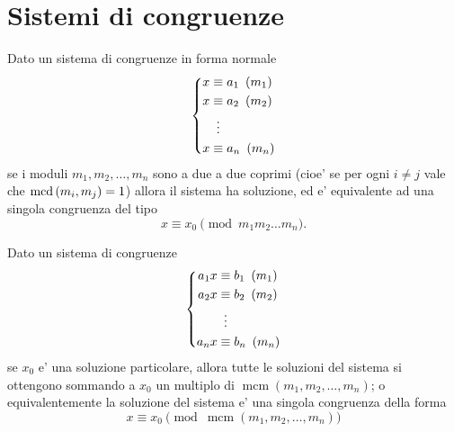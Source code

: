 \section{Sistemi di congruenze}

\begin{theorem}
    Dato un sistema di congruenze in forma normale 
    \begin{equation*}
        \left\{
        \begin{alignedat}{1}
            x&\equiv a_1 \Mod{m_1}\\
            x&\equiv a_2 \Mod{m_2}\\
            &\vdotswithin{\equiv} \\
            x&\equiv a_n \Mod{m_n}
        \end{alignedat}      
        \right . 
    \end{equation*}
    se i moduli $m_1, m_2, \dots, m_n$ sono a due a due coprimi (cioe' se per ogni $i \neq j$ vale che $\operatorname{mcd}\left(m_i, m_j\right) = 1$) allora il sistema ha soluzione, ed e' equivalente ad una singola congruenza del tipo
    \begin{equation}
        x \equiv x_0 \pmod{m_1 m_2 \dots m_n}.
    \end{equation} 
\end{theorem}

\begin{proposition}
    Dato un sistema di congruenze 
    \begin{equation*}
        \left\{
        \begin{alignedat}{1}
            a_1x &\equiv b_1 \Mod{m_1}\\
            a_2x &\equiv b_2 \Mod{m_2}\\
            &\vdotswithin{\equiv} \\
            a_nx &\equiv b_n \Mod{m_n}
        \end{alignedat}      
        \right . 
    \end{equation*}
    se $x_0$ e' una soluzione particolare, allora tutte le soluzioni del sistema si ottengono sommando a $x_0$ un multiplo di $\operatorname{mcm}(m_1, m_2, \dots, m_n)$; o equivalentemente la soluzione del sistema e' una singola congruenza della forma
    \begin{equation}
        x \equiv x_0 \pmod{\operatorname{mcm}(m_1, m_2, \dots, m_n)}
    \end{equation}
\end{proposition}

